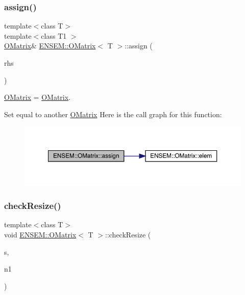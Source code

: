 \subsubsection{\texorpdfstring{assign()}{assign()}\hspace{0.1cm}{\footnotesize\ttfamily [9/9]}}
{\footnotesize\ttfamily template$<$class T$>$ \\
template$<$class T1 $>$ \\
\mbox{\hyperlink{classENSEM_1_1OMatrix}{O\+Matrix}}\& \mbox{\hyperlink{classENSEM_1_1OMatrix}{E\+N\+S\+E\+M\+::\+O\+Matrix}}$<$ T $>$\+::assign (\begin{DoxyParamCaption}\item[{const \mbox{\hyperlink{classENSEM_1_1OMatrix}{O\+Matrix}}$<$ T1 $>$ \&}]{rhs }\end{DoxyParamCaption})\hspace{0.3cm}{\ttfamily [inline]}}



\mbox{\hyperlink{classENSEM_1_1OMatrix}{O\+Matrix}} = \mbox{\hyperlink{classENSEM_1_1OMatrix}{O\+Matrix}}. 

Set equal to another \mbox{\hyperlink{classENSEM_1_1OMatrix}{O\+Matrix}} Here is the call graph for this function\+:
\nopagebreak
\begin{figure}[H]
\begin{center}
\leavevmode
\includegraphics[width=350pt]{dd/d80/classENSEM_1_1OMatrix_a37ed216c9ecfe42f7a357573699b3bfc_cgraph}
\end{center}
\end{figure}
\mbox{\label{classENSEM_1_1OMatrix_a04fb9c7a5ca8da8a54aff3a8bafec571}} 
\subsubsection{\texorpdfstring{checkResize()}{checkResize()}\hspace{0.1cm}{\footnotesize\ttfamily [1/9]}}
{\footnotesize\ttfamily template$<$class T$>$ \\
void \mbox{\hyperlink{classENSEM_1_1OMatrix}{E\+N\+S\+E\+M\+::\+O\+Matrix}}$<$ T $>$\+::check\+Resize (\begin{DoxyParamCaption}\item[{const char $\ast$}]{s,  }\item[{int}]{n1 }\end{DoxyParamCaption})\hspace{0.3cm}{\ttfamily [inline]}}

